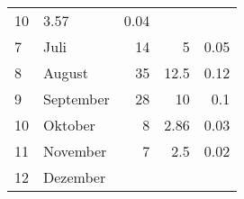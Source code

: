 \begin{longtable}{lXrrr}
       \num{10} &
       \num[round-mode=places,round-precision=2]{3,57} &
         \num[round-mode=places,round-precision=2]{0,04} \\

     7 &
     \multicolumn{1}{X}{ Juli   } &


       \num{14} &
       \num[round-mode=places,round-precision=2]{5} &
         \num[round-mode=places,round-precision=2]{0,05} \\

     8 &
     \multicolumn{1}{X}{ August   } &


       \num{35} &
       \num[round-mode=places,round-precision=2]{12,5} &
         \num[round-mode=places,round-precision=2]{0,12} \\

     9 &
     \multicolumn{1}{X}{ September   } &


       \num{28} &
       \num[round-mode=places,round-precision=2]{10} &
         \num[round-mode=places,round-precision=2]{0,1} \\

     10 &
     \multicolumn{1}{X}{ Oktober   } &


       \num{8} &
       \num[round-mode=places,round-precision=2]{2,86} &
         \num[round-mode=places,round-precision=2]{0,03} \\

     11 &
     \multicolumn{1}{X}{ November   } &


       \num{7} &
       \num[round-mode=places,round-precision=2]{2,5} &
         \num[round-mode=places,round-precision=2]{0,02} \\

     12 &
     \multicolumn{1}{X}{ Dezember   } &



\end{longtable}
